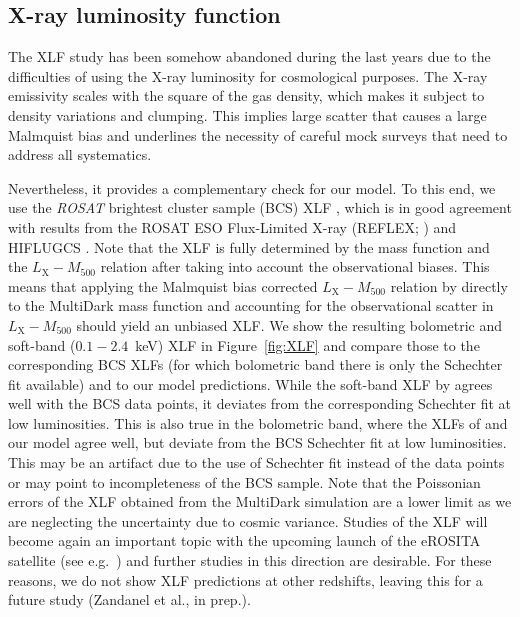 \documentclass[traditabstract]{aa}
\newcommand{\rmn}{\mathrm}
\begin{document}
\subsection{X-ray luminosity function}

The XLF study has been somehow abandoned during the last years due to the
difficulties of using the X-ray luminosity for cosmological purposes. The X-ray
emissivity scales with the square of the gas density, which makes it subject to
density variations and clumping. This implies large scatter that causes a large
Malmquist bias and underlines the necessity of careful mock surveys that need to
address all systematics.

Nevertheless, it provides a complementary check for our model. To this end, we
use the \emph{ROSAT} brightest cluster sample (BCS) XLF
\citep{1997ApJ...479L.101E}, which is in good agreement with results from the
ROSAT ESO Flux-Limited X-ray (REFLEX; \citealp{2002ApJ...566...93B}) and
HIFLUGCS \citep{2002ApJ...567..716R}.  Note that the XLF is fully determined by
the mass function and the $L_{\rmn{X}}-M_{500}$ relation after taking into
account the observational biases. This means that applying the Malmquist bias
corrected $L_{\rmn{X}}-M_{500}$ relation by \cite{2010MNRAS.406.1773M} directly
to the MultiDark mass function and accounting for the observational scatter in
$L_{\rmn{X}}-M_{500}$ should yield an unbiased XLF. We show the resulting
bolometric and soft-band ($0.1-2.4$~keV) XLF in Figure~\ref{fig:XLF} and compare
those to the corresponding BCS XLFs (for which bolometric band there is only the 
Schechter fit available) and to our model predictions.  While the soft-band XLF by
\cite{2010MNRAS.406.1773M} agrees well with the BCS data points, it deviates
from the corresponding Schechter fit at low luminosities. This is also true in
the bolometric band, where the XLFs of \cite{2010MNRAS.406.1773M} and our model
agree well, but deviate from the BCS Schechter fit at low luminosities. This may
be an artifact due to the use of Schechter fit instead of the data points or may
point to incompleteness of the BCS sample. Note that the Poissonian errors of
the XLF obtained from the MultiDark simulation are a lower limit as we are
neglecting the uncertainty due to cosmic variance.  Studies of the XLF will
become again an important topic with the upcoming launch of the eROSITA
satellite (see e.g.~\citealp{2011MSAIS..17..159C}) and further studies in this
direction are desirable. For these reasons, we do not show XLF predictions at
other redshifts, leaving this for a future study (Zandanel et al., in prep.).
\end{document}
